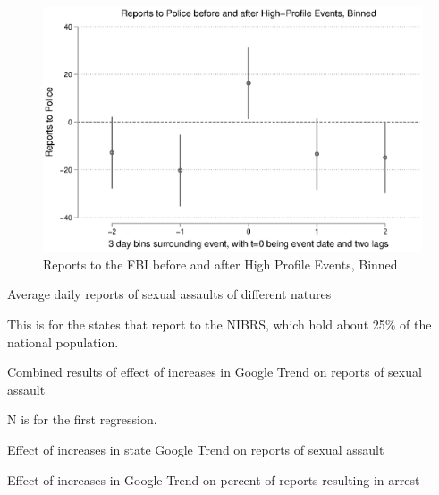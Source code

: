 \documentclass[AER,draftmode]{AEA}
\begin{document}
\begin{figure}
\includegraphics[width=\linewidth]{figures/events_police_binned.eps}
\caption{Reports to the FBI before and after High Profile Events, Binned} \label{figure:events_police_binned}
\end{figure}

\clearpage

\begin{table}[]
\caption{Average daily reports of sexual assaults of different natures} \label{table:summary}

\begin{tablenotes}
This is for the states that report to the NIBRS, which hold about 25\% of the national population.
\end{tablenotes}
\end{table}

\begin{table}[]
\caption{Combined results of effect of increases in Google Trend on reports of sexual assault} \label{table:combinedtable}

\begin{tablenotes}
N is for the first regression.
\end{tablenotes}
\end{table}

\begin{table}[]
\caption{Effect of increases in state Google Trend on reports of sexual assault} \label{table:state_daily}

\end{table}

\begin{table}[]
\caption{Effect of increases in Google Trend on percent of reports resulting in arrest} \label{table:arrest}

\end{table}
\end{document}
